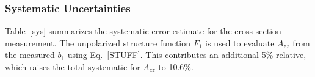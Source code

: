 %



\subsubsection{Systematic Uncertainties}
Table~\ref{sys} summarizes the systematic error estimate for the cross section measurement.
The unpolarized structure function
$F_1$ is used to evaluate $A_{zz}$ from the measured $b_1$  using Eq.~\ref{STUFF}.   This contributes an additional 5\% relative, which raises the total systematic for $A_{zz}$ to 10.6\%.


